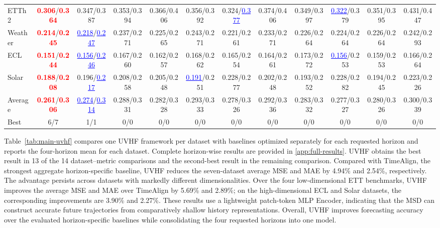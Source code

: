 \documentclass[final,3p,times]{elsarticle}
\begin{document}
\begin{table}[t]
{\begin{tabular}{l|ccccccccccc}
ETTh2 & \textcolor{red}{\textbf{0.306}}/\textcolor{red}{\textbf{0.364}} & 0.347/0.387 & 0.353/0.394 & 0.366/0.406 & 0.356/0.392 & 0.324/\textcolor{blue}{\underline{0.377}} & 0.374/0.406 & 0.349/0.397 & \textcolor{blue}{\underline{0.322}}/0.379 & 0.351/0.395 & 0.431/0.447 \\
Weather & \textcolor{red}{\textbf{0.214}}/\textcolor{red}{\textbf{0.245}} & \textcolor{blue}{\underline{0.218}}/\textcolor{blue}{\underline{0.247}} & 0.237/0.271 & 0.225/0.265 & 0.243/0.271 & 0.221/0.261 & 0.233/0.271 & 0.226/0.264 & 0.224/0.264 & 0.226/0.264 & 0.242/0.293 \\
ECL & \textcolor{red}{\textbf{0.151}}/\textcolor{red}{\textbf{0.244}} & \textcolor{blue}{\underline{0.156}}/\textcolor{blue}{\underline{0.246}} & 0.167/0.260 & 0.162/0.257 & 0.168/0.262 & 0.165/0.254 & 0.164/0.261 & 0.173/0.272 & \textcolor{blue}{\underline{0.156}}/0.253 & 0.159/0.253 & 0.166/0.264 \\
Solar & \textcolor{red}{\textbf{0.188}}/\textcolor{red}{\textbf{0.208}} & 0.196/\textcolor{blue}{\underline{0.217}} & 0.208/0.258 & 0.205/0.248 & \textcolor{blue}{\underline{0.191}}/0.251 & 0.228/0.277 & 0.202/0.248 & 0.193/0.252 & 0.228/0.282 & 0.194/0.245 & 0.223/0.226 \\
\midrule
Average & \textcolor{red}{\textbf{0.261}}/\textcolor{red}{\textbf{0.306}} & \textcolor{blue}{\underline{0.274}}/\textcolor{blue}{\underline{0.314}} & 0.288/0.331 & 0.282/0.328 & 0.293/0.333 & 0.278/0.326 & 0.292/0.336 & 0.283/0.332 & 0.277/0.327 & 0.280/0.326 & 0.300/0.339 \\
\midrule
Best & 6/7 & 1/1 & 0/0 & 0/0 & 0/0 & 0/0 & 0/0 & 0/0 & 0/0 & 0/0 & 0/0 \\
\bottomrule
\end{tabular}%
}
\end{table}


Table~\ref{tab:main-uvhf} compares one UVHF framework per dataset with baselines optimized separately for each requested horizon and reports the four-horizon mean for each dataset. Complete horizon-wise results are provided in \ref{app:full-results}. UVHF obtains the best result in 13 of the 14 dataset--metric comparisons and the second-best result in the remaining comparison. Compared with TimeAlign, the strongest aggregate horizon-specific baseline, UVHF reduces the seven-dataset average MSE and MAE by 4.94\% and 2.54\%, respectively. The advantage persists across datasets with markedly different dimensionalities. Over the four low-dimensional ETT benchmarks, UVHF improves the average MSE and MAE over TimeAlign by 5.69\% and 2.89\%; on the high-dimensional ECL and Solar datasets, the corresponding improvements are 3.90\% and 2.27\%. These results use a lightweight patch-token MLP Encoder, indicating that the MSD can construct accurate future trajectories from comparatively shallow history representations. Overall, UVHF improves forecasting accuracy over the evaluated horizon-specific baselines while consolidating the four requested horizons into one model.
\end{document}
